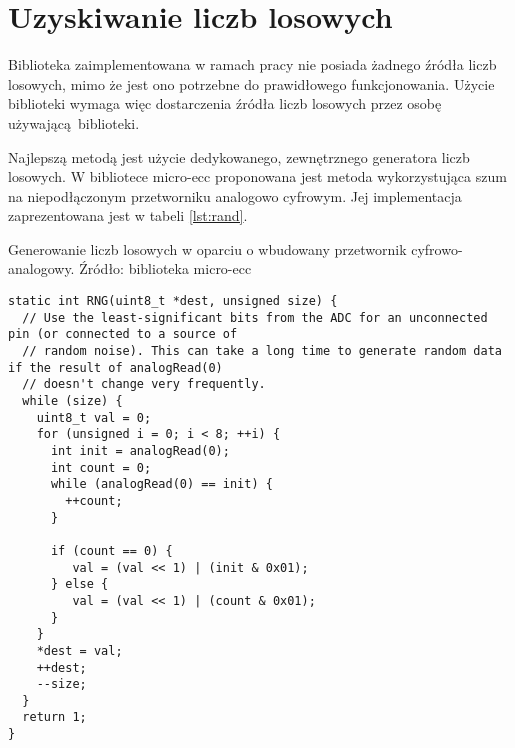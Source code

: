 \chapter{Uzyskiwanie liczb losowych}
\label{app:randgen}



Biblioteka zaimplementowana w ramach pracy nie posiada żadnego źródła liczb losowych, mimo że jest ono potrzebne do prawidłowego funkcjonowania. Użycie biblioteki wymaga więc dostarczenia źródła liczb losowych przez osobę używającą biblioteki.

Najlepszą metodą jest użycie dedykowanego, zewnętrznego generatora liczb losowych. W bibliotece micro-ecc proponowana jest metoda wykorzystująca szum na niepodłączonym przetworniku analogowo cyfrowym. Jej implementacja zaprezentowana jest w tabeli \ref{lst:rand}.

\begin{table}[!htb]
\caption{Generowanie liczb losowych w oparciu o wbudowany przetwornik cyfrowo-analogowy. Źródło: biblioteka micro-ecc}
\label{lst:rand}
\begin{lstlisting}
static int RNG(uint8_t *dest, unsigned size) {
  // Use the least-significant bits from the ADC for an unconnected pin (or connected to a source of 
  // random noise). This can take a long time to generate random data if the result of analogRead(0) 
  // doesn't change very frequently.
  while (size) {
    uint8_t val = 0;
    for (unsigned i = 0; i < 8; ++i) {
      int init = analogRead(0);
      int count = 0;
      while (analogRead(0) == init) {
        ++count;
      }
      
      if (count == 0) {
         val = (val << 1) | (init & 0x01);
      } else {
         val = (val << 1) | (count & 0x01);
      }
    }
    *dest = val;
    ++dest;
    --size;
  }
  return 1;
}
\end{lstlisting}
\end{table}
